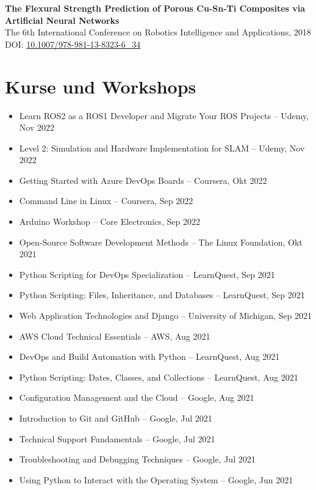 \documentclass[11pt,a4paper]{article}
\begin{document}
\textbf{\color{PrimaryColor}The Flexural Strength Prediction of Porous Cu-Sn-Ti Composites via Artificial Neural Networks}\\
The 6th International Conference on Robotics Intelligence and Applications, 2018\\
DOI:
\href{https://doi.org/10.1007/978-981-13-8323-6_34}
{10.1007/978-981-13-8323-6\_34}

\section*{Kurse und Workshops}

\begin{itemize}
    \item Learn ROS2 as a ROS1 Developer and Migrate Your ROS Projects -- Udemy, Nov 2022
    \item Level 2: Simulation and Hardware Implementation for SLAM -- Udemy, Nov 2022
    \item Getting Started with Azure DevOps Boards -- Coursera, Okt 2022
    \item Command Line in Linux -- Coursera, Sep 2022
    \item Arduino Workshop -- Core Electronics, Sep 2022
    \item Open-Source Software Development Methods -- The Linux Foundation, Okt 2021
    \item Python Scripting for DevOps Specialization -- LearnQuest, Sep 2021
    \item Python Scripting: Files, Inheritance, and Databases -- LearnQuest, Sep 2021
    \item Web Application Technologies and Django -- University of Michigan, Sep 2021
    \item AWS Cloud Technical Essentials -- AWS, Aug 2021
    \item DevOps and Build Automation with Python -- LearnQuest, Aug 2021
    \item Python Scripting: Dates, Classes, and Collections -- LearnQuest, Aug 2021
    \item Configuration Management and the Cloud -- Google, Aug 2021
    \item Introduction to Git and GitHub -- Google, Jul 2021
    \item Technical Support Fundamentals -- Google, Jul 2021
    \item Troubleshooting and Debugging Techniques -- Google, Jul 2021
    \item Using Python to Interact with the Operating System -- Google, Jun 2021

\end{itemize}
\end{document}

